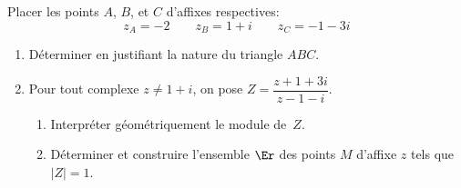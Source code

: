 \begin{exercice}

 Placer les points $A$, $B$, et $C$ d'affixes respectives:
\[ z_A=-2 \qquad z_B=1+i \qquad z_C=-1-3i\]

\begin{enumerate}
\item D\'eterminer en justifiant la nature du triangle $ABC$.
\item Pour tout complexe $z\neq 1+i$, on pose
  $Z=\dfrac{z+1+3i}{z-1-i}$. 

  \begin{enumerate}
  \item Interpr\'eter g\'eom\'etriquement le  module de~$Z$.
  \item D\'eterminer et construire l'ensemble $\Er$ des points $M$
    d'affixe $z$ tels que $|Z|=1$.
  \end{enumerate}
\end{enumerate}
\end{exercice}
